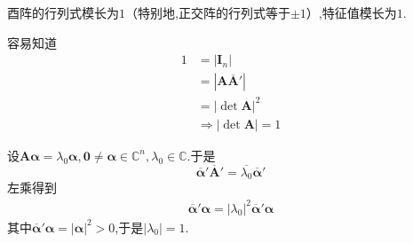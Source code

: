 \begin{formal}
    \begin{proposition}[酉阵的值]\label{prop:酉阵的值}
        酉阵的行列式模长为$1$（特别地,正交阵的行列式等于$\pm1$）,特征值模长为$1$.
    \end{proposition}
    \begin{Proof}
        容易知道\begin{align*}
            1&=\left|\bm{I}_n\right|\\
            &=\left|
                \bm{A}\overline{\bm{A}}'
            \right|\\
            &=\left|
                \det\bm{A}
            \right|^2\\
            &\Longrightarrow\left|\det\bm{A}\right|=1
        \end{align*}

        设$\bm{A\alpha}=\lambda_0\bm{\alpha},\bm{0}\neq\bm{\alpha}\in \mathbb{C}^n,\lambda_0\in\mathbb{C}$.于是\[
        \overline{\bm{\alpha}}'\overline{\bm{A}}'=\overline{\lambda_0}\overline{\bm{\alpha}}'
        \]左乘得到\begin{align*}
            \overline{\bm{\alpha}}'\bm{\alpha}=\left|\lambda_0\right|^2\overline{\bm{\alpha}}'\bm{\alpha}
        \end{align*}其中$\overline{\bm{\alpha}}'\bm{\alpha}=\left|\bm{\alpha}\right|^2>0$,于是$\left|\lambda_0\right|=1$.
    \end{Proof}
\end{formal}
